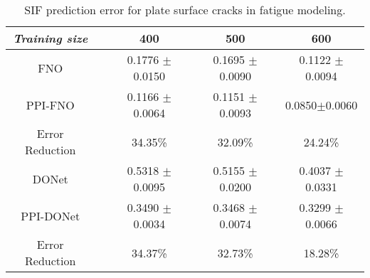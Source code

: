 \begin{table*}[htbp!]
\caption{\small SIF prediction error for plate surface cracks in fatigue modeling.}
    \label{tab:crack}
    \small 
    \centering
    \begin{tabular}{ccccc}
        \hline
        \textit{Training size}      &  & {400}             & {500}         & {600}      \\ \hline
        FNO                  &  & 0.1776 $\pm$ 0.0150	& 0.1695 $\pm$ 0.0090   & 0.1122 $\pm$ 0.0094          \\
        PPI-FNO          &  & {0.1166} $\pm$ {0.0064}          & {0.1151} $\pm$ {0.0093}        &{0.0850}$\pm${0.0060} \\
        Error Reduction          &  & 34.35\% & 32.09\%        & 24.24\%		 \\ \hline
        DONet             &  & 0.5318 $\pm$ 0.0095          & 0.5155 $\pm$ 0.0200      & 0.4037 $\pm$ 0.0331 	  \\
        PPI-DONet             &  & 0.3490 $\pm$ 0.0034        & 0.3468 $\pm$ 0.0074    	& 0.3299 $\pm$ 0.0066	 \\ 
        Error Reduction  &  & 34.37\%         & 32.73\%    	& 18.28\%  \\ \hline
    \end{tabular}
    \end{table*}

